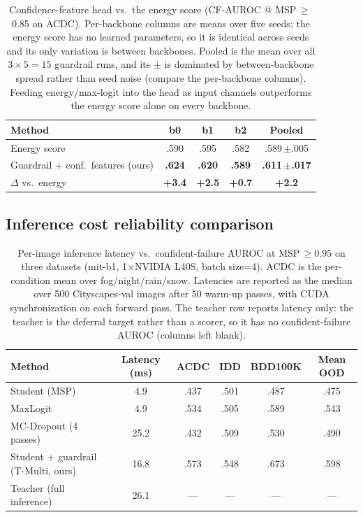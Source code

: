 \documentclass{article}
\newcommand{\win}[1]{\textcolor{wingreen}{\textbf{#1}}}
\begin{document}
\begin{table}[H]
\centering
\small
\setlength{\tabcolsep}{6pt}
\caption{Confidence-feature head vs.\ the energy score (CF-AUROC @ MSP$\,{\geq}\,$0.85 on ACDC). Per-backbone columns are means over five seeds; the energy score has no learned parameters, so it is identical across seeds and its only variation is between backbones. Pooled is the mean over all $3{\times}5{=}15$ guardrail runs, and its $\pm$ is dominated by between-backbone spread rather than seed noise (compare the per-backbone columns). Feeding energy/max-logit into the head as input channels outperforms the energy score alone on every backbone.}
\label{tab:conffeat}
\begin{tabular}{lcccc}
\toprule
Method & b0 & b1 & b2 & Pooled \\
\midrule
Energy score & .590 & .595 & .582 & .589\,{\scriptsize$\pm$.005} \\
Guardrail $+$ conf.\ features (ours) & \win{.624} & \win{.620} & \win{.589} & \win{.611\,{\scriptsize$\pm$.017}} \\
\midrule
$\Delta$ vs.\ energy & \win{+3.4} & \win{+2.5} & \win{+0.7} & \win{+2.2} \\
\bottomrule
\end{tabular}
\end{table}


\subsection{Inference cost reliability comparison}
\label{sec:latency}

\begin{table}[H]
\centering
\small
\setlength{\tabcolsep}{6pt}
\caption{Per-image inference latency vs.\ confident-failure AUROC at MSP$\,\geq 0.95$ on three datasets (mit-b1, 1$\times$NVIDIA L40S, batch size=4). ACDC is the per-condition mean over fog/night/rain/snow. Latencies are reported as the median over 500 Cityscapes-val images after 50 warm-up passes, with CUDA synchronization on each forward pass. The teacher row reports latency only: the teacher is the deferral target rather than a scorer, so it has no confident-failure AUROC (columns left blank).}
\label{tab:latency-auroc}
\begin{tabular}{lccccc}
\toprule
Method & Latency (ms) & ACDC & IDD & BDD100K & Mean OOD \\
\midrule
Student (MSP)        & 4.9 & .437 & .501 & .487 & .475 \\
MaxLogit           & 4.9 & .534 & .505 & .589 & .543 \\
MC-Dropout (4 passes)    & 25.2 & .432 & .509 & .530 & .490 \\
Student + guardrail (T-Multi, ours) & 16.8 & .573 & .548 & .673 & .598 \\
Teacher (full inference)  & 26.1 & --- & --- & --- & --- \\
\bottomrule
\end{tabular}
\end{table}
\end{document}
